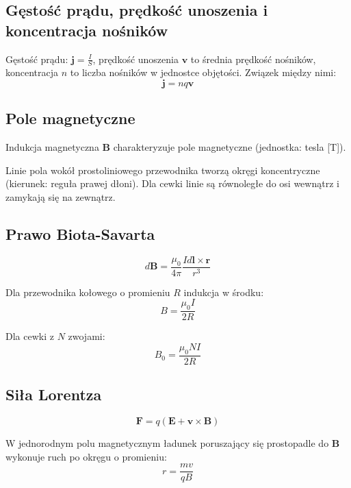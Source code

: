 \documentclass{fizykalab}
\begin{document}
\subsection{Gęstość prądu, prędkość unoszenia i koncentracja nośników}
Gęstość prądu: $\mathbf{j} = \frac{I}{S}$, prędkość unoszenia $\mathbf{v}$ to średnia prędkość nośników, koncentracja $n$ to liczba nośników w jednostce objętości. Związek między nimi:
\begin{equation}
  \mathbf{j} = nq\mathbf{v}
\end{equation}

\subsection{Pole magnetyczne}
Indukcja magnetyczna $\mathbf{B}$ charakteryzuje pole magnetyczne (jednostka: tesla [T]).

Linie pola wokół prostoliniowego przewodnika tworzą okręgi koncentryczne (kierunek: reguła prawej dłoni). Dla cewki linie są równoległe do osi wewnątrz i zamykają się na zewnątrz.

\subsection{Prawo Biota-Savarta}
\begin{equation}
  d\mathbf{B} = \frac{\mu_0}{4\pi} \frac{I d\mathbf{l} \times \mathbf{r}}{r^3}
\end{equation}

Dla przewodnika kołowego o promieniu $R$ indukcja w środku:
\begin{equation}
  B = \frac{\mu_0 I}{2R}
\end{equation}

Dla cewki z $N$ zwojami:
\begin{equation}
  B_0 = \frac{\mu_0 N I}{2R}
\end{equation}

\subsection{Siła Lorentza}
\begin{equation}
  \mathbf{F} = q(\mathbf{E} + \mathbf{v} \times \mathbf{B})
\end{equation}

W jednorodnym polu magnetycznym ładunek poruszający się prostopadle do $\mathbf{B}$ wykonuje ruch po okręgu o promieniu:
\begin{equation}
  r = \frac{mv}{qB}
\end{equation}
\end{document}
